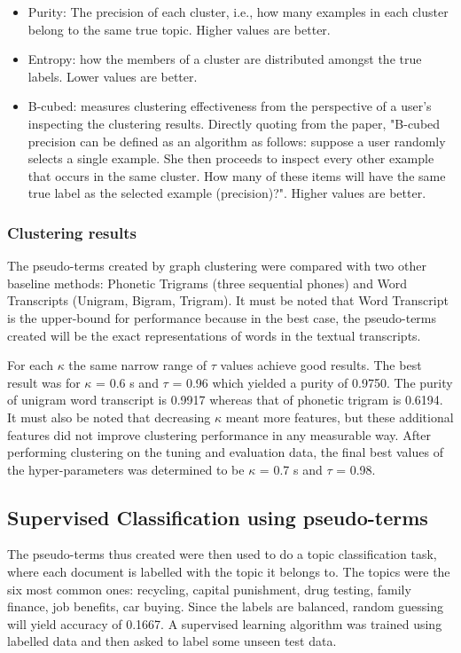 \documentclass[a4paper]{article}
\begin{document}
\begin{itemize}
\item Purity: The precision of each cluster, i.e., how many examples in each cluster belong to the same true topic. Higher values are better.
\item Entropy: how the members of a cluster are distributed amongst the true labels. Lower values are better.
\item B-cubed: measures clustering effectiveness from the perspective of a user’s inspecting the clustering results. Directly quoting from the paper, "B-cubed precision can be defined as an algorithm as follows: suppose a user randomly selects a single example. She then proceeds to inspect every other example that occurs in the same cluster. How many of these items will have the same true label as the selected example (precision)?". Higher values are better.
\end{itemize}

\subsubsection{Clustering results}
The pseudo-terms created by graph clustering were compared with two other baseline methods: Phonetic Trigrams (three sequential phones) and Word Transcripts (Unigram, Bigram, Trigram). It must be noted that Word Transcript is the upper-bound for performance because in the best case, the pseudo-terms created will be the exact representations of words in the textual transcripts.

For each $\kappa$ the same narrow range of $\tau$ values achieve good results. The best result was for $\kappa$ = 0.6 s and $\tau$ = 0.96 which yielded a purity of 0.9750. The purity of unigram word transcript is 0.9917 whereas that of phonetic trigram is 0.6194. It must also be noted that decreasing $\kappa$ meant more features, but these additional features did not improve clustering performance in any measurable way. After performing clustering on the tuning and evaluation data, the final best values of the hyper-parameters was determined to be $\kappa$ = 0.7 s and $\tau$ = 0.98.

\subsection{Supervised Classification using pseudo-terms}
The pseudo-terms thus created were then used to do a topic classification task, where each document is labelled with the topic it belongs to. The topics were the six most common ones: recycling, capital punishment, drug testing, family finance, job benefits, car buying. Since the labels are balanced, random guessing will yield accuracy of 0.1667. A supervised learning algorithm was trained using labelled data and then asked to label some unseen test data.
\end{document}
